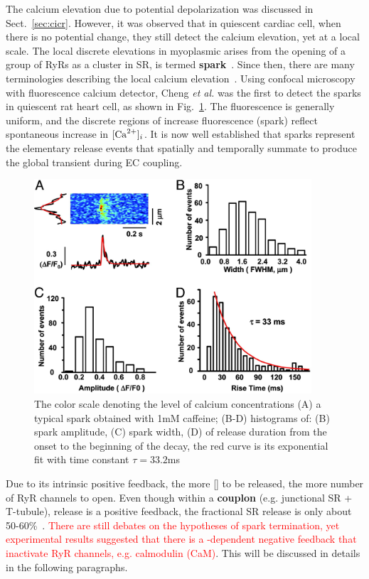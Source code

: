 The calcium elevation due to potential depolarization was discussed in
Sect.~\ref{sec:cicr}. However, it was observed that in quiescent
cardiac cell, when there is no potential change, they still detect the
calcium elevation, yet at a local scale.  The local discrete
elevations in myoplasmic  arises from the opening of a group
of RyRs as a cluster in SR, is termed
{\bf {} spark}~\citep{Cheng1993Calciumspark}. Since then, there
are many terminologies describing the local calcium
elevation~\citep{cheng2008cs}. Using confocal microscopy with
fluorescence calcium detector, Cheng {\it et al.} was the first to
detect the  sparks in quiescent rat heart cell, as shown in
Fig.~\ref{fig:calcium-spark}. The fluorescence is generally uniform,
and the discrete regions of increase fluorescence (spark) reflect
spontaneous increase in $[\ce{Ca^2+}]_i$. It is now well established
that  sparks represent the elementary  release
events that spatially and temporally summate to produce the global
 transient during EC coupling.


\begin{figure}[hbt]
  \centerline{\includegraphics[height=8cm]{./images/calcium_spark.eps}}
  \caption{The color scale denoting the level of calcium
    concentrations (A) a typical  spark obtained with 1mM
    caffeine; (B-D) histograms of: (B) spark amplitude, (C) spark
    width, (D) of release duration from the onset to the beginning of
    the decay, the red curve is its exponential fit with time constant
    $\tau=33.2$ms}
  \label{fig:calcium-spark}
\end{figure}

Due to its intrinsic positive feedback, the more [] to be
released, the more number of RyR channels to open.  Even though within
a {\bf couplon} (e.g. junctional SR + T-tubule),  release is
a positive feedback, the fractional SR  release is only
about 50-60\%~\citep{bassani1995fsr}.
\textcolor{red}{There are still debates on the hypotheses of spark
  termination, yet experimental results suggested that there is a
  -dependent negative feedback that inactivate RyR channels,
  e.g. calmodulin (CaM)}.
This will be discussed in details in the following paragraphs.

